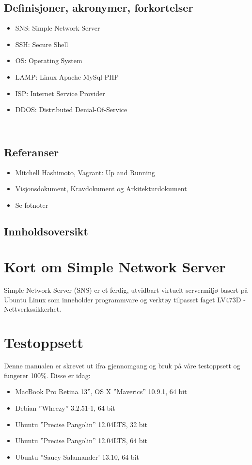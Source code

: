 \documentclass{article}
\begin{document}
\subsection{Definisjoner, akronymer, forkortelser}
\begin{itemize}
\item SNS: Simple Network Server
\item SSH: Secure Shell
\item OS: Operating System
\item LAMP: Linux Apache MySql PHP
\item ISP: Internet Service Provider
\item DDOS: Distributed Denial-Of-Service
\end{itemize}
\\
\subsection{Referanser}
\begin{itemize}
\item{Mitchell Hashimoto, Vagrant: Up and Running}
\item Visjonsdokument, Kravdokument og Arkitekturdokument
\item Se fotnoter
\end{itemize}
\subsection{Innholdsoversikt}
\section{Kort om Simple Network Server}
Simple Network Server (SNS) er et ferdig, utvidbart virtuelt servermiljø basert på Ubuntu Linux som inneholder programmvare og verktøy tilpasset faget LV473D -Nettverkssikkerhet. 
\section{Testoppsett}
Denne manualen er skrevet ut ifra gjennomgang og bruk på våre testoppsett og fungerer 100\%. Disse er idag: 
\begin{itemize}
\item MacBook Pro Retina 13'', OS X  ''Maverics'' 10.9.1, 64 bit
\item Debian ''Wheezy'' 3.2.51-1, 64 bit
\item Ubuntu ''Precise Pangolin'' 12.04LTS, 32 bit
\item Ubuntu ''Precise Pangolin'' 12.04LTS, 64 bit
\item Ubuntu ''Saucy Salamander' 13.10, 64 bit
\end{itemize}
\end{document}
